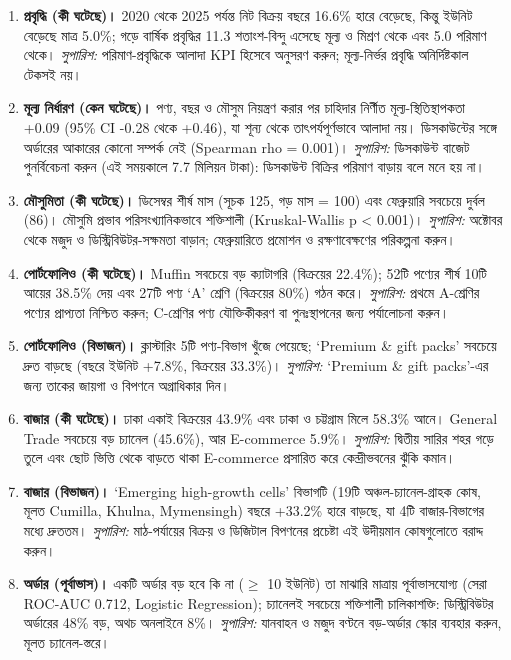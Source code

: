 \begin{enumerate}[leftmargin=*,itemsep=4pt]
\item \textbf{প্রবৃদ্ধি (কী ঘটেছে)।} 2020 থেকে 2025 পর্যন্ত নিট বিক্রয় বছরে 16.6\% হারে বেড়েছে, কিন্তু ইউনিট বেড়েছে মাত্র 5.0\%; গড়ে বার্ষিক প্রবৃদ্ধির 11.3 শতাংশ-বিন্দু এসেছে মূল্য ও মিশ্রণ থেকে এবং 5.0 পরিমাণ থেকে। \emph{সুপারিশ:} পরিমাণ-প্রবৃদ্ধিকে আলাদা KPI হিসেবে অনুসরণ করুন; মূল্য-নির্ভর প্রবৃদ্ধি অনির্দিষ্টকাল টেকসই নয়।
\item \textbf{মূল্য নির্ধারণ (কেন ঘটেছে)।} পণ্য, বছর ও মৌসুম নিয়ন্ত্রণ করার পর চাহিদার নির্ণীত মূল্য-স্থিতিস্থাপকতা +0.09 (95\% CI -0.28 থেকে +0.46), যা শূন্য থেকে তাৎপর্যপূর্ণভাবে আলাদা নয়। ডিসকাউন্টের সঙ্গে অর্ডারের আকারের কোনো সম্পর্ক নেই (Spearman rho = 0.001)। \emph{সুপারিশ:} ডিসকাউন্ট বাজেট পুনর্বিবেচনা করুন (এই সময়কালে 7.7 মিলিয়ন টাকা): ডিসকাউন্ট বিক্রির পরিমাণ বাড়ায় বলে মনে হয় না।
\item \textbf{মৌসুমিতা (কী ঘটেছে)।} ডিসেম্বর শীর্ষ মাস (সূচক 125, গড় মাস = 100) এবং ফেব্রুয়ারি সবচেয়ে দুর্বল (86)। মৌসুমি প্রভাব পরিসংখ্যানিকভাবে শক্তিশালী (Kruskal-Wallis p < 0.001)। \emph{সুপারিশ:} অক্টোবর থেকে মজুদ ও ডিস্ট্রিবিউটর-সক্ষমতা বাড়ান; ফেব্রুয়ারিতে প্রমোশন ও রক্ষণাবেক্ষণের পরিকল্পনা করুন।
\item \textbf{পোর্টফোলিও (কী ঘটেছে)।} Muffin সবচেয়ে বড় ক্যাটাগরি (বিক্রয়ের 22.4\%); 52টি পণ্যের শীর্ষ 10টি আয়ের 38.5\% দেয় এবং 27টি পণ্য `A' শ্রেণি (বিক্রয়ের 80\%) গঠন করে। \emph{সুপারিশ:} প্রথমে A-শ্রেণির পণ্যের প্রাপ্যতা নিশ্চিত করুন; C-শ্রেণির পণ্য যৌক্তিকীকরণ বা পুনঃস্থাপনের জন্য পর্যালোচনা করুন।
\item \textbf{পোর্টফোলিও (বিভাজন)।} ক্লাস্টারিং 5টি পণ্য-বিভাগ খুঁজে পেয়েছে; `Premium \& gift packs' সবচেয়ে দ্রুত বাড়ছে (বছরে ইউনিট +7.8\%, বিক্রয়ের 33.3\%)। \emph{সুপারিশ:} `Premium \& gift packs'-এর জন্য তাকের জায়গা ও বিপণনে অগ্রাধিকার দিন।
\item \textbf{বাজার (কী ঘটেছে)।} ঢাকা একাই বিক্রয়ের 43.9\% এবং ঢাকা ও চট্টগ্রাম মিলে 58.3\% আনে। General Trade সবচেয়ে বড় চ্যানেল (45.6\%), আর E-commerce 5.9\%। \emph{সুপারিশ:} দ্বিতীয় সারির শহর গড়ে তুলে এবং ছোট ভিত্তি থেকে বাড়তে থাকা E-commerce প্রসারিত করে কেন্দ্রীভবনের ঝুঁকি কমান।
\item \textbf{বাজার (বিভাজন)।} `Emerging high-growth cells' বিভাগটি (19টি অঞ্চল-চ্যানেল-গ্রাহক কোষ, মূলত Cumilla, Khulna, Mymensingh) বছরে +33.2\% হারে বাড়ছে, যা 4টি বাজার-বিভাগের মধ্যে দ্রুততম। \emph{সুপারিশ:} মাঠ-পর্যায়ের বিক্রয় ও ডিজিটাল বিপণনের প্রচেষ্টা এই উদীয়মান কোষগুলোতে বরাদ্দ করুন।
\item \textbf{অর্ডার (পূর্বাভাস)।} একটি অর্ডার বড় হবে কি না ($\geq$ 10 ইউনিট) তা মাঝারি মাত্রায় পূর্বাভাসযোগ্য (সেরা ROC-AUC 0.712, Logistic Regression); চ্যানেলই সবচেয়ে শক্তিশালী চালিকাশক্তি: ডিস্ট্রিবিউটর অর্ডারের 48\% বড়, অথচ অনলাইনে 8\%। \emph{সুপারিশ:} যানবাহন ও মজুদ বণ্টনে বড়-অর্ডার স্কোর ব্যবহার করুন, মূলত চ্যানেল-স্তরে।

\end{enumerate}
